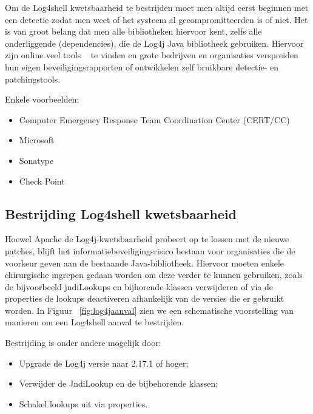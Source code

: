 \documentclass{hogent-article}
\begin{document}
Om de Log4shell kwetsbaarheid te bestrijden moet men altijd eerst beginnen met een detectie zodat men weet of het systeem al gecompromitteerden is of niet. Het is van groot belang dat men alle bibliotheken hiervoor kent, zelfs alle onderliggende (dependencies), die de Log4j Java bibliotheek gebruiken. Hiervoor zijn online veel tools ~\autocite{Roth2022} te vinden en grote bedrijven en organisaties verspreiden hun eigen beveiligingsrapporten of ontwikkelen zelf bruikbare detectie- en patchingstools.

Enkele voorbeelden:
\begin{itemize}[leftmargin=*]
    \item Computer Emergency Response Team Coordination Center (CERT/CC) ~\autocite{CERTCC2022}
    \item Microsoft ~\autocite{MSRC2021, MDTIT2022}
    \item Sonatype ~\autocite{Mishra2021}
    \item Check Point ~\autocite{Checkpoint2021}
\end{itemize}

\subsection{Bestrijding Log4shell kwetsbaarheid}

Hoewel Apache de Log4j-kwetsbaarheid probeert op te lossen met de nieuwe patches, blijft het informatiebeveiligingsrisico bestaan voor organisaties die de voorkeur geven aan de bestaande Java-bibliotheek. Hiervoor moeten enkele chirurgische ingrepen gedaan worden om deze verder te kunnen gebruiken, zoals de bijvoorbeeld jndiLookups en bijhorende klassen verwijderen of via de properties de lookups deactiveren afhankelijk van de versies die er gebruikt worden.
In Figuur ~\ref{fig:log4jaanval} zien we een schematische voorstelling van manieren om een Log4shell aanval te bestrijden.

Bestrijding is onder andere mogelijk door:
\begin{itemize}[leftmargin=*]
    \item Upgrade de Log4j versie naar 2.17.1 of hoger;
    \item Verwijder de JndiLookup en de bijbehorende klassen;
    \item Schakel lookups uit via properties.
\end{itemize}
\end{document}

